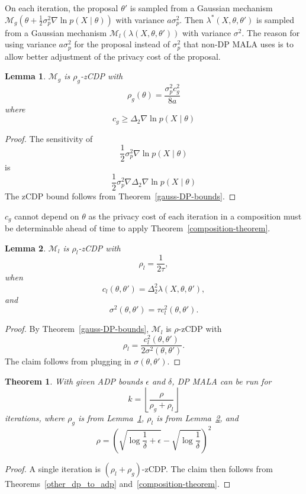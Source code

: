 \documentclass[english,twoside,openright]{HYgraduMLDS}
\newtheorem{lemma}{Lemma}
\newtheorem{theorem}{Theorem}
\newcommand{\calm}{{\mathcal{M}}}
\begin{document}
On each iteration, the proposal \(\theta'\) is sampled from a Gaussian 
mechanism \(\calm_g(\theta + \frac{1}{2}\sigma^2_p\nabla \ln p(X\mid \theta))\)
with variance \(a\sigma_p^2\).
Then \(\lambda^*(X, \theta, \theta')\) is sampled from a 
Gaussian mechanism \(\calm_l(\lambda(X, \theta, \theta'))\) with variance 
\(\sigma^2\). The reason for using variance \(a\sigma^2_p\) for the proposal 
instead of \(\sigma^2_p\) that non-DP MALA uses is to allow better adjustment 
of the privacy cost of the proposal.

\begin{lemma}\label{dp_mala_gradient}
    \(\calm_g\) is \(\rho_g\)-zCDP with 
    \[
        \rho_g(\theta) = \frac{\sigma_p^2 c_g^2}{8a}
    \]
    where 
    \[
        c_g \geq \Delta_2 \nabla \ln p(X\mid \theta)
    \]
\end{lemma}
\begin{proof}
    The sensitivity of 
    \[
        \frac{1}{2}\sigma_p^2 \nabla \ln p(X\mid \theta)
    \]
    is 
    \[
        \frac{1}{2}\sigma_p^2 \nabla \Delta_2 \nabla \ln p(X\mid \theta)
    \]
    The zCDP bound follows from Theorem~\ref{gauss-DP-bounds}.
\end{proof}

\(c_g\) cannot depend on \(\theta\) as the privacy cost of each iteration in 
a composition must be determinable ahead of time to apply 
Theorem~\ref{composition-theorem}.

\begin{lemma}\label{dp_mala_likelihood_bound}
    \(\calm_l\) is \(\rho_l\)-zCDP with 
    \[
        \rho_l = \frac{1}{2\tau},
    \]
    when 
    \[
        c_l(\theta, \theta') = \Delta_2^2 \lambda(X, \theta, \theta'),
    \]
    and
    \[
        \sigma^2(\theta, \theta') = \tau c^2_l(\theta, \theta').
    \]
\end{lemma}
\begin{proof}
    By Theorem~\ref{gauss-DP-bounds}, \(\calm_l\) is \(\rho\)-zCDP with
    \[
        \rho_l = \frac{c_l^2(\theta, \theta')}{2\sigma^2(\theta, \theta')}.
    \]
    The claim follows from plugging in \(\sigma(\theta, \theta')\).
\end{proof}

\begin{theorem}\label{dp_mala_zcdp_bound}
    With given ADP bounds \(\epsilon\) and \(\delta\),
    DP MALA can be run for 
    \[
        k = \left\lfloor \frac{\rho}{\rho_g + \rho_l} \right\rfloor
    \]
    iterations, where \(\rho_g\) is from Lemma~\ref{dp_mala_gradient},
    \(\rho_l\) is from Lemma~\ref{dp_mala_likelihood_bound}, and
    \[
        \rho = \left(\sqrt{\log \frac{1}{\delta} + \epsilon} 
        - \sqrt{\log \frac{1}{\delta}}\right)^2
    \]
\end{theorem}
\begin{proof}
    A single iteration is \((\rho_l + \rho_g)\)-zCDP. The claim then follows from 
    Theorems~\ref{other_dp_to_adp} and~\ref{composition-theorem}.
\end{proof}
\end{document}
